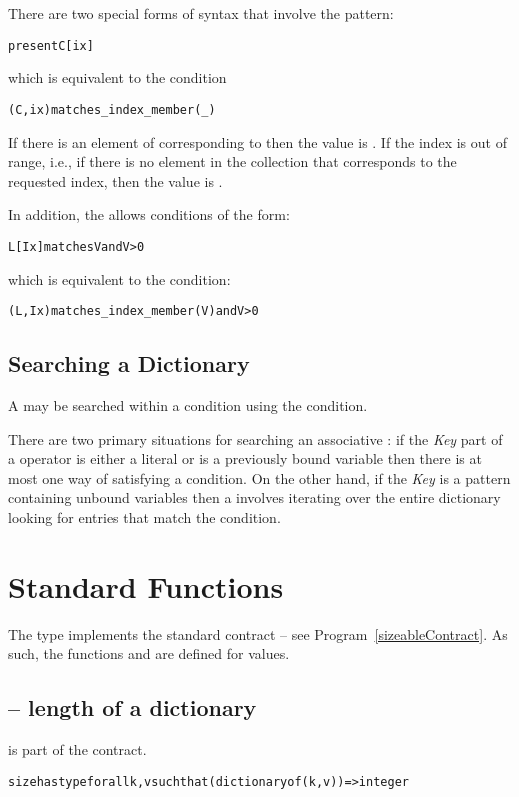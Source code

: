 There are two special forms of syntax that involve the  pattern:
\begin{alltt}
present C[ix]
\end{alltt}
which is equivalent to the condition
\begin{alltt}
(C,ix) matches \_index\_member(_)
\end{alltt}
If there is an element of  corresponding to  then the value is .
If the index is out of range, i.e., if there is no element in the collection that corresponds to the requested index, then the value is .

In addition, the  allows conditions of the form:
\begin{alltt}
L[Ix] matches V and V>0
\end{alltt}
which is equivalent to the condition:
\begin{alltt}
(L,Ix) matches _index_member(V) and V>0
\end{alltt}

\subsection{Searching a Dictionary}
\label{searchMap}

A  may be searched within a condition using the  condition.

There are two primary situations for searching an associative : if the \emph{Key} part of a  operator is either a literal or is a previously bound variable then there is at most one way of satisfying a  condition. On the other hand, if the \emph{Key} is a pattern containing unbound variables then a  involves iterating over the entire dictionary looking for entries that match the condition.


\section{Standard  Functions}
\label{standardMap}

The  type implements the standard  contract -- see Program~\vref{sizeableContract}. As such, the functions  and  are defined for  values.

\subsection{ -- length of a dictionary}
\label{sizeMapFunction}
 is part of the  contract.
\begin{alltt}
size has type for all k,v such that (dictionary of (k,v))=>integer
\end{alltt}

